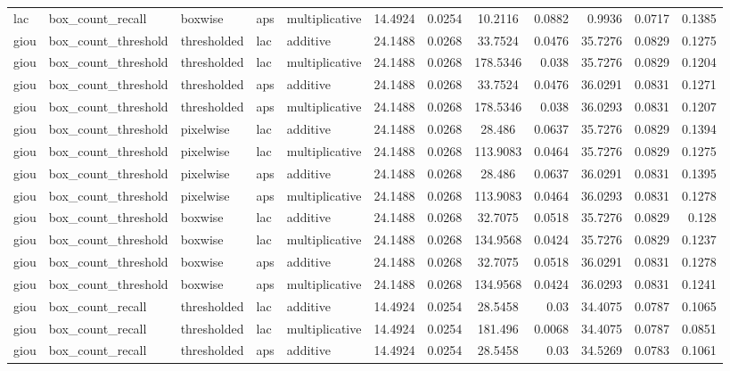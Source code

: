 \begin{table*}[htbp]
\begin{tabular}{@{}lllll rrcrrcr@{}}
lac & box\_count\_recall & boxwise & aps & multiplicative & 14.4924 & 0.0254 & 10.2116 & 0.0882 & 0.9936 & 0.0717 & 0.1385 \\
giou & box\_count\_threshold & thresholded & lac & additive & 24.1488 & 0.0268 & 33.7524 & 0.0476 & 35.7276 & 0.0829 & 0.1275 \\
giou & box\_count\_threshold & thresholded & lac & multiplicative & 24.1488 & 0.0268 & 178.5346 & 0.038 & 35.7276 & 0.0829 & 0.1204 \\
giou & box\_count\_threshold & thresholded & aps & additive & 24.1488 & 0.0268 & 33.7524 & 0.0476 & 36.0291 & 0.0831 & 0.1271 \\
giou & box\_count\_threshold & thresholded & aps & multiplicative & 24.1488 & 0.0268 & 178.5346 & 0.038 & 36.0293 & 0.0831 & 0.1207 \\
giou & box\_count\_threshold & pixelwise & lac & additive & 24.1488 & 0.0268 & 28.486 & 0.0637 & 35.7276 & 0.0829 & 0.1394 \\
giou & box\_count\_threshold & pixelwise & lac & multiplicative & 24.1488 & 0.0268 & 113.9083 & 0.0464 & 35.7276 & 0.0829 & 0.1275 \\
giou & box\_count\_threshold & pixelwise & aps & additive & 24.1488 & 0.0268 & 28.486 & 0.0637 & 36.0291 & 0.0831 & 0.1395 \\
giou & box\_count\_threshold & pixelwise & aps & multiplicative & 24.1488 & 0.0268 & 113.9083 & 0.0464 & 36.0293 & 0.0831 & 0.1278 \\
giou & box\_count\_threshold & boxwise & lac & additive & 24.1488 & 0.0268 & 32.7075 & 0.0518 & 35.7276 & 0.0829 & 0.128 \\
giou & box\_count\_threshold & boxwise & lac & multiplicative & 24.1488 & 0.0268 & 134.9568 & 0.0424 & 35.7276 & 0.0829 & 0.1237 \\
giou & box\_count\_threshold & boxwise & aps & additive & 24.1488 & 0.0268 & 32.7075 & 0.0518 & 36.0291 & 0.0831 & 0.1278 \\
giou & box\_count\_threshold & boxwise & aps & multiplicative & 24.1488 & 0.0268 & 134.9568 & 0.0424 & 36.0293 & 0.0831 & 0.1241 \\
giou & box\_count\_recall & thresholded & lac & additive & 14.4924 & 0.0254 & 28.5458 & 0.03 & 34.4075 & 0.0787 & 0.1065 \\
giou & box\_count\_recall & thresholded & lac & multiplicative & 14.4924 & 0.0254 & 181.496 & 0.0068 & 34.4075 & 0.0787 & 0.0851 \\
giou & box\_count\_recall & thresholded & aps & additive & 14.4924 & 0.0254 & 28.5458 & 0.03 & 34.5269 & 0.0783 & 0.1061 \\

\end{tabular}
\end{table*}
